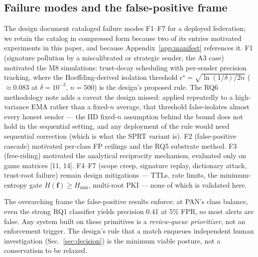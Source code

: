 \documentclass[11pt]{article}
\begin{document}
\subsection{Failure modes and the false-positive frame}
\label{sec:failure}
The design document cataloged failure modes F1--F7 for a deployed federation; we retain the catalog in compressed form because two of its entries motivated experiments in this paper, and because Appendix~\ref{app:manifest} references it. F1 (signature pollution by a miscalibrated or strategic sender, the A3 case) motivated the M8 simulations: trust-decay scheduling with per-sender precision tracking, where the Hoeffding-derived isolation threshold $\epsilon^\star = \sqrt{\ln(1/\delta)/2n}$ ($\approx 0.083$ at $\delta = 10^{-3}$, $n = 500$) is the design's proposed rule. The RQ6 methodology note adds a caveat the design missed: applied repeatedly to a high-variance EMA rather than a fixed-$n$ average, that threshold false-isolates almost every honest sender --- the IID fixed-$n$ assumption behind the bound does not hold in the sequential setting, and any deployment of the rule would need sequential correction (which is what the SPRT variant is). F2 (false-positive cascade) motivated per-class FP ceilings and the RQ5 substrate method. F3 (free-riding) motivated the analytical reciprocity mechanism, evaluated only on game matrices [11, 14]. F4--F7 (scope creep, signature replay, dictionary attack, trust-root failure) remain design mitigations --- TTLs, rate limits, the minimum-entropy gate $H(\mathbf{f}) \geq H_{\min}$, multi-root PKI --- none of which is validated here.

The overarching frame the false-positive results enforce: at PAN's class balance, even the strong RQ1 classifier yields precision 0.41 at 5\% FPR, so most alerts are false. Any system built on these primitives is a \emph{review-queue prioritizer}, not an enforcement trigger. The design's rule that a match enqueues independent human investigation (Sec.~\ref{sec:decision}) is the minimum viable posture, not a conservatism to be relaxed.
\end{document}
